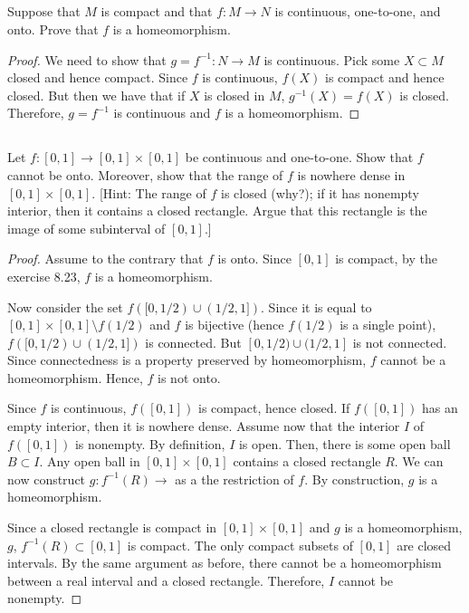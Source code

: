 \subsection{} Suppose that $M$ is compact and that $f : M \rightarrow N$ is continuous, one-to-one, and onto. Prove that $f$ is a homeomorphism. 

\begin{proof}
We need to show that $g = f^{-1}: N \rightarrow M$ is continuous. Pick some $X \subset M$ closed and hence compact. Since $f$ is continuous, $f(X)$ is compact and hence closed. But then we have that if $X$ is closed in $M$, $g^{-1}(X)=f(X)$ is closed. Therefore, $g = f^{-1}$ is continuous and $f$ is a homeomorphism.

\end{proof}

\subsection{} Let $f: [ 0, 1 ] \rightarrow [ 0, 1] \times [ 0, 1]$ be continuous and one-to-one.  Show that $f$ cannot be onto. Moreover, show that the range of $f$ is nowhere dense in  $[0, 1] \times [0, 1]$. [Hint: The range of $f$ is closed (why?); if it has nonempty interior, then it contains a closed rectangle. Argue that this rectangle is the image of some subinterval of $[0, 1]$.] 

\begin{proof}
Assume to the contrary that $f$ is onto. Since $[0,1]$ is compact, by the exercise 8.23, $f$ is a homeomorphism.

Now consider the set $f([0,1/2) \cup (1/2, 1])$. Since it is equal to $[0,1] \times [0,1] \setminus f(1/2)$ and $f$ is bijective (hence $f(1/2)$ is a single point), $f([0,1/2) \cup (1/2, 1])$ is connected. But $[0,1/2) \cup (1/2, 1]$ is not connected. Since connectedness is a property preserved by homeomorphism, $f$ cannot be a homeomorphism. Hence, $f$ is not onto.

\vspace{1em}

Since $f$ is continuous, $f([0,1])$ is compact, hence closed. If $f([0,1])$ has an empty interior, then it is nowhere dense. Assume now that the interior $I$ of $f([0,1])$ is nonempty. By definition, $I$ is open. Then, there is some open ball $B \subset I$. Any open ball in $[0,1] \times [0,1]$ contains a closed rectangle $R$. We can now construct $g: f^{-1}(R) \rightarrow $ as a the restriction of $f$. By construction, $g$ is a homeomorphism.

Since a closed rectangle is compact in $[0,1] \times [0,1]$ and $g$ is a homeomorphism, $g$, $f^{-1}(R) \subset [0,1]$ is compact. The only compact subsets of $[0,1]$ are closed intervals. By the same argument as before, there cannot be a homeomorphism between a real interval and a closed rectangle. Therefore, $I$ cannot be nonempty.


\end{proof}


